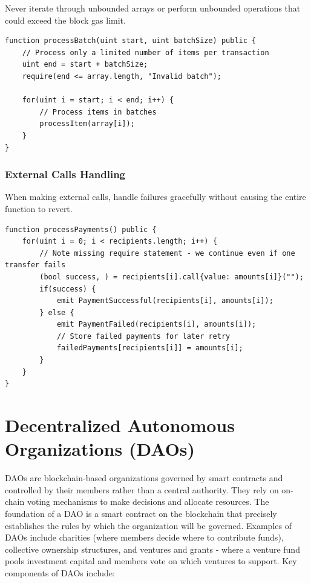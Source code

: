 \documentclass[12pt]{article}
\begin{document}
Never iterate through unbounded arrays or perform unbounded operations that could exceed the block gas limit.

\noindent
\begin{minipage}{\textwidth}
\begin{lstlisting}[language=Solidity, caption=Bounded Operations Example]
function processBatch(uint start, uint batchSize) public {
    // Process only a limited number of items per transaction
    uint end = start + batchSize;
    require(end <= array.length, "Invalid batch");
    
    for(uint i = start; i < end; i++) {
        // Process items in batches
        processItem(array[i]);
    }
}
\end{lstlisting}
\end{minipage}

\subsubsection*{External Calls Handling}

When making external calls, handle failures gracefully without causing the entire function to revert.

\noindent
\begin{minipage}{\textwidth}
\begin{lstlisting}[language=Solidity, caption=Safe External Call Example]
function processPayments() public {
    for(uint i = 0; i < recipients.length; i++) {
        // Note missing require statement - we continue even if one transfer fails
        (bool success, ) = recipients[i].call{value: amounts[i]}("");
        if(success) {
            emit PaymentSuccessful(recipients[i], amounts[i]);
        } else {
            emit PaymentFailed(recipients[i], amounts[i]);
            // Store failed payments for later retry
            failedPayments[recipients[i]] = amounts[i];
        }
    }
}
\end{lstlisting}
\end{minipage}

\section{Decentralized Autonomous Organizations (DAOs)}

DAOs are blockchain-based organizations governed by smart contracts and controlled by their members rather than a central authority. They rely on on-chain voting mechanisms to make decisions and allocate resources. The foundation of a DAO is a smart contract on the blockchain that precisely establishes the rules by which the organization will be governed. Examples of DAOs include charities (where members decide where to contribute funds), collective ownership structures, and ventures and grants - where a venture fund pools investment capital and members vote on which ventures to support. Key components of DAOs include:
\end{document}
